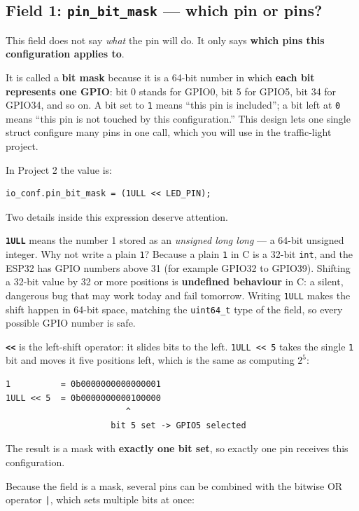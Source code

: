 \documentclass[11pt]{article}
\begin{document}
\subsection{Field 1: \texttt{pin\_bit\_mask} --- which pin or pins?}

This field does not say \emph{what} the pin will do. It only says \textbf{which pins this configuration applies to}.

It is called a \textbf{bit mask} because it is a 64-bit number in which \textbf{each bit represents one GPIO}: bit 0 stands for GPIO0, bit 5 for GPIO5, bit 34 for GPIO34, and so on. A bit set to \texttt{1} means ``this pin is included''; a bit left at \texttt{0} means ``this pin is not touched by this configuration.'' This design lets one single struct configure many pins in one call, which you will use in the traffic-light project.

In Project 2 the value is:

\begin{verbatim}
io_conf.pin_bit_mask = (1ULL << LED_PIN);
\end{verbatim}

Two details inside this expression deserve attention.

\textbf{\texttt{1ULL}} means the number 1 stored as an \emph{unsigned long long} --- a 64-bit unsigned integer. Why not write a plain \texttt{1}? Because a plain \texttt{1} in C is a 32-bit \texttt{int}, and the ESP32 has GPIO numbers above 31 (for example GPIO32 to GPIO39). Shifting a 32-bit value by 32 or more positions is \textbf{undefined behaviour} in C: a silent, dangerous bug that may work today and fail tomorrow. Writing \texttt{1ULL} makes the shift happen in 64-bit space, matching the \texttt{uint64\_t} type of the field, so every possible GPIO number is safe.

\textbf{\texttt{<<}} is the left-shift operator: it slides bits to the left. \texttt{1ULL << 5} takes the single \texttt{1} bit and moves it five positions left, which is the same as computing $2^5$:

\begin{verbatim}
1          = 0b0000000000000001
1ULL << 5  = 0b0000000000100000
                        ^
                     bit 5 set -> GPIO5 selected
\end{verbatim}

The result is a mask with \textbf{exactly one bit set}, so exactly one pin receives this configuration.

Because the field is a mask, several pins can be combined with the bitwise OR operator \texttt{|}, which sets multiple bits at once:
\end{document}
